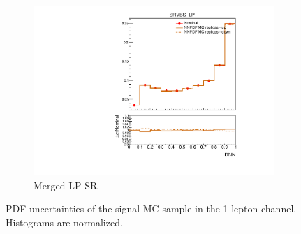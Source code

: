 \begin{figure}[ht]
\begin{subfigure}[b]{0.3\textwidth}
        \includegraphics[width=\textwidth]{figures/1lep/PDFUnc/NNPDF_DNN/EW6lvqq_0ptag1pfat0pjet_0ptv_SRVBS_LP_DNN_SysTheoryPDF_NNPDF_VBS__1up_Norm.pdf}
        \caption{Merged LP SR}
    \end{subfigure}
    \caption{PDF uncertainties of the signal MC sample in the 1-lepton channel. Histograms are normalized.}
    \label{fig:PDFUnc1Lep_sig}
\end{figure}


